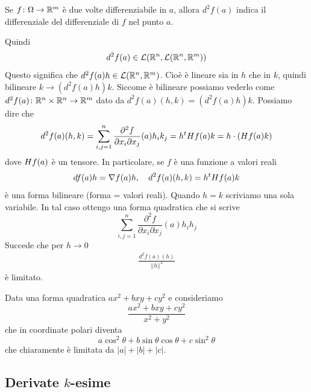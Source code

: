 \documentclass[a4paper]{article}
\begin{document}
\begin{radioactive}
\begin{snippetdefinition}{}
    Se \(f \colon \Omega \to \mathbb{R}^m\) è due volte differenziabile in \(a\),
    allora \(d^2 f(a)\) indica il differenziale del differenziale di \(f\) nel punto \(a\).
\end{snippetdefinition}

Quindi
\[
    d^2f(a) \in \mathcal{L}(\mathbb{R}^n, \mathcal{L}(\mathbb{R}^n, \mathbb{R}^m))
\]
Questo significa che \(d^2f(a) h \in \mathcal{L}(\mathbb{R}^n, \mathbb{R}^m)\).
Cioè è lineare sia in \(h\) che in \(k\), quindi bilineare
\(k \to (d^2f(a)h)k\).
Siccome è bilineare possiamo vederlo come \(d^2f(a) \colon \mathbb{R}^n \times \mathbb{R}^n \to \mathbb{R}^m\)
dato da \(d^2f(a)(h,k) = (d^2f(a)h)k\).
Possiamo dire che
\[
    d^2f(a)(h,k) = \sum_{i,j=1}^n \frac{\partial^2 f}{\partial x_i \partial x_j}(a)h_ik_j
    = h^t H f(a) k = h\cdot(H f(a)k)
\]
dove \(H f(a)\) è un tensore.
In particolare, se \(f\) è una funzione a valori reali
\[
    df(a) h = \nabla f(a) h, \quad
    d^2f(a)(h,k) = h^t H f(a) k
\]
è una forma bilineare (forma = valori reali).
Quando \(h=k\) scriviamo una sola variabile.
In tal caso ottengo una forma quadratica che si scrive
\[
    \sum_{i,j=1}^n \frac{\partial^2 f}{\partial x_i \partial x_j}(a)h_i h_j    
\]
Succede che per \(h \to 0\)
\begin{align*}
    \frac{d^2f(a)(h)}{||h||^2}
\end{align*}
è limitato.
\end{radioactive}

\begin{radioactive}
\begin{snippetexample}{}
    Data una forma quadratica \(ax^2 + bxy + cy^2\)
    e consideriamo
    \[
        \frac{ax^2 + bxy + cy^2}{x^2+y^2}
    \]
    che in coordinate polari diventa
    \[
        a\cos^2 \theta + b \sin\theta\cos\theta + c\sin^2 \theta
    \]
    che chiaramente è limitata da \(|a| + |b| + |c|\).
\end{snippetexample}
\end{radioactive}

\subsection{Derivate \(k\)-esime}
\end{document}
